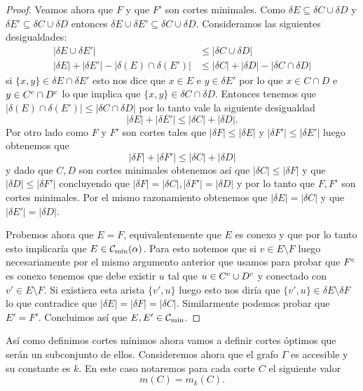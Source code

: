 \documentclass[tesis.tex]{subfiles}
\begin{document}
\begin{proof}
	Veamos ahora que $F$ y que $F'$ son cortes minimales.
	Como $\delta E \subseteq \delta C \cup \delta D$ y $\delta E' \subseteq \delta C \cup \delta D$ entonces $\delta E \cup \delta E' \subseteq \delta C \cup \delta D$.
	Consideramos las siguientes desigualdades:
	\begin{align*}
		|\delta E \cup \delta E'| & \le |\delta C \cup \delta D| \\
		|\delta E| + |\delta E'| - |\delta (E) \cap \delta (E')| & \le |\delta C| + |\delta D| - |\delta C \cap \delta D|
	\end{align*}
	si $\{x,y\} \in \delta E \cap \delta E'$ esto nos dice que $x \in E$ e $y \in \delta E'$ por lo que $x \in C \cap D$ e $y \in C^{c} \cap D^{c}$ lo que implica que $\{x,y\} \in \delta C \cap \delta D$.
	Entonces tenemos que $|\delta (E) \cap \delta (E')| \le |\delta C \cap \delta D|$ por lo tanto vale la siguiente desigualdad
	\[
	|\delta E| + |\delta E'| \le |\delta C| + |\delta D|.
	\]	
	Por otro lado como $F$ y $F'$ son cortes tales que $|\delta F| \le |\delta E|$ y $|\delta F'| \le |\delta E'|$ luego obtenemos que
	\[
	|\delta F| + |\delta F'| \le |\delta C| + |\delta D|
	\] 
	y dado que $C,D$ son cortes minimales obtenemos así que $|\delta C| \le |\delta F|$ y que $|\delta D| \le |\delta F'|$ concluyendo que $|\delta F | = |\delta C|, |\delta F'| = |\delta D|$ y por lo tanto que $F,F'$ son cortes minimales.
	Por el mismo razonamiento obtenemos que $|\delta E| = |\delta C|$ y que $|\delta E'| = |\delta D|$.
	
	Probemos ahora que $E=F$, equivalentemente que $E$ es conexo y que por lo tanto esto implicaría que $E \in {\cal C}_{\text{min}}(\alpha)$.
	Para esto notemos que si $v \in E \setminus F$ luego necesariamente por el mismo argumento anterior que usamos para probar que $F^{c}$ es conexo tenemos que debe existir $u$ tal que $u \in C^{c} \cup D^{c}$ y conectado con $v' \in E \setminus F$.
	Si existiera esta arista $\{v',u \}$ luego esto nos diría que $\{v',u \} \in \delta E \setminus \delta F$ lo que contradice que $|\delta E| = |\delta F| = |\delta C|$.
	Similarmente podemos probar que $E' = F'$.
	Concluimos así que $E, E' \in {\cal C}_{\text{min}}$.
\end{proof}



Así como definimos cortes mínimos ahora vamos a definir cortes óptimos que serán un subconjunto de ellos.
Consideremos ahora que el grafo $\Gamma$ es accesible y su constante es $k$.
En este caso notaremos para cada corte $C$ el siguiente valor
\[
m(C) = m_k(C).
\]
\end{document}
